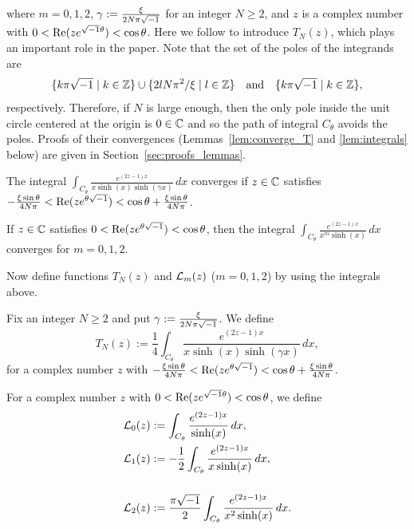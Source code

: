 where $m=0,1,2$, $\gamma:=\frac{\xi}{2N\pi\sqrt{-1}}$ for an integer $N\ge2$, and $z$ is a complex number with $0<\operatorname{Re}(ze^{\sqrt{-1}\theta})<\cos\theta$.
Here we follow \cite{Faddeev:LETMP1995} to introduce $T_N(z)$, which plays an important role in the paper.
Note that the set of the poles of the integrands are
\begin{equation*}
  \{k\pi\sqrt{-1}\mid k\in\mathbb{Z}\}\cup\{2lN\pi^2/\xi\mid l\in\mathbb{Z}\}
  \quad\text{and}\quad
  \{k\pi\sqrt{-1}\mid k\in\mathbb{Z}\},
\end{equation*}
respectively.
Therefore, if $N$ is large enough, then the only pole inside the unit circle centered at the origin is $0\in\mathbb{C}$ and so the path of integral $C_{\theta}$ avoids the poles.
Proofs of their convergences (Lemmas~\ref{lem:converge_T} and \ref{lem:integrals} below) are given in Section~\ref{sec:proofs_lemmas}.
\begin{lem}\label{lem:converge_T}
The integral $\int_{C_{\theta}}\frac{e^{(2z-1)x}}{x\sinh(x)\sinh(\gamma x)}\,dx$ converges if $z\in\mathbb{C}$ satisfies $-\frac{\xi\sin\theta}{4N\pi}<\operatorname{Re}(ze^{\theta\sqrt{-1}})<\cos\theta+\frac{\xi\sin\theta}{4N\pi}$.
\end{lem}
\begin{lem}\label{lem:integrals}
If $z\in\mathbb{C}$ satisfies $0<\operatorname{Re}(ze^{\theta\sqrt{-1}})<\cos\theta$, then the integral $\int_{C_{\theta}}\frac{e^{(2z-1)x}}{x^{m}\sinh(x)}\,dx$ converges for $m=0,1,2$.
\end{lem}
\par
Now define functions $T_N(z)$ and $\mathcal{L}_{m}(z)$ ($m=0,1,2$) by using the integrals above.
\begin{defn}
Fix an integer $N\ge2$ and put $\gamma:=\frac{\xi}{2N\pi\sqrt{-1}}$.
We define
\begin{equation*}
  T_N(z)
  :=
  \frac{1}{4}
  \int_{C_{\theta}}
  \frac{e^{(2z-1)x}}{x\sinh(x)\sinh(\gamma x)}\,dx,
\end{equation*}
for a complex number $z$ with $-\frac{\xi\sin\theta}{4N\pi}<\operatorname{Re}(ze^{\theta\sqrt{-1}})<\cos\theta+\frac{\xi\sin\theta}{4N\pi}$.
\end{defn}
\par
\begin{defn}
For a complex number $z$ with $0<\operatorname{Re}(ze^{\sqrt{-1}\theta})<\cos\theta$, we define
\begin{align*}
  \mathcal{L}_0(z)
  &:=
  \int_{C_{\theta}}\frac{e^{(2z-1)x}}{\sinh(x)}\,dx,
  \\
  \mathcal{L}_1(z)
  &:=
  -\frac{1}{2}
  \int_{C_{\theta}}\frac{e^{(2z-1)x}}{x\sinh(x)}\,dx,
  \\[5mm]
  \mathcal{L}_2(z)
  &:=
  \frac{\pi\sqrt{-1}}{2}
  \int_{C_{\theta}}\frac{e^{(2z-1)x}}{x^2\sinh(x)}\,dx.
\end{align*}
\end{defn}
